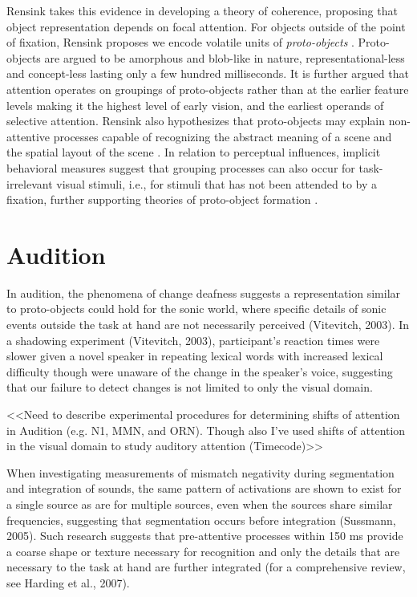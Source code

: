 Rensink takes this evidence in developing a theory of coherence, proposing that object representation depends on focal attention.  For objects outside of the point of fixation, Rensink proposes we encode volatile units of \textit{proto-objects} \cite{Rensink2000,Rensink2001}.  Proto-objects are argued to be amorphous and blob-like in nature, representational-less and concept-less lasting only a few hundred milliseconds.  It is further argued that attention operates on groupings of proto-objects rather than at the earlier feature levels making it the highest level of early vision, and the earliest operands of selective attention.  Rensink also hypothesizes that proto-objects may explain non-attentive processes capable of recognizing the abstract meaning of a scene and the spatial layout of the scene \cite{Rensink2002}.  In relation to perceptual influences, implicit behavioral measures suggest that grouping processes can also occur for task-irrelevant visual stimuli, i.e., for stimuli that has not been attended to by a fixation, further supporting theories of proto-object formation \cite{Lamy2006}.

\section{Audition}

In audition, the phenomena of change deafness suggests a representation similar to proto-objects could hold for the sonic world, where specific details of sonic events outside the task at hand are not necessarily perceived (Vitevitch, 2003).  In a shadowing experiment (Vitevitch, 2003), participant's reaction times were slower given a novel speaker in repeating lexical words with increased lexical difficulty though were unaware of the change in the speaker's voice, suggesting that our failure to detect changes is not limited to only the visual domain. 

<<Need to describe experimental procedures for determining shifts of attention in Audition (e.g. N1, MMN, and ORN).  Though also I've used shifts of attention in the visual domain to study auditory attention (Timecode)>>

When investigating measurements of mismatch negativity during segmentation and integration of sounds, the same pattern of activations are shown to exist for a single source as are for multiple sources, even when the sources share similar frequencies, suggesting that segmentation occurs before integration (Sussmann, 2005). Such research suggests that pre-attentive processes within 150 ms provide a coarse shape or texture necessary for recognition and only the details that are necessary to the task at hand are further integrated (for a comprehensive review, see Harding et al., 2007).  
	
